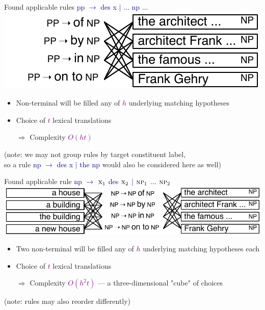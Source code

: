 \documentclass[landscape]{slides}
\newcommand{\example}[1]{\textcolor{darkblue}{\rm #1}}
\newcommand{\maths}[1]{\textcolor{purple}{#1}}
\begin{document}

\vspace{5mm}
\begin{center}
Found applicable rules \example{{\sc pp} $\rightarrow$ des {\sc x} $|$ ... {\sc np} ...}\\[5mm]
\includegraphics[scale=1.5]{cube-pruning-lexrule.pdf}
\end{center}
\begin{itemize} \itemsep -3mm
\item Non-terminal will be filled any of \maths{$h$} underlying matching hypotheses
\item Choice of \maths{$t$} lexical translations 
\item[$\Rightarrow$] Complexity \maths{$O(ht)$}
\end{itemize}
\begin{center}
{\small (note: we may not group rules by target constituent label,\\ so a rule \example{{\sc np} $\rightarrow$ des {\sc x} $|$ the {\sc np}} would also be considered here as well)}
\end{center}


\vspace{5mm}
\begin{center}
Found applicable rule \example{{\sc np} $\rightarrow$ $\text{\sc x}_1$ des $\text{\sc x}_2$ $|$ $\text{\sc np}_1$ ... $\text{\sc np}_2$}\\[5mm]
\includegraphics[scale=1.5]{cube-pruning-3.pdf}
\end{center}
\begin{itemize} \itemsep -3mm
\item Two non-terminal will be filled any of \maths{$h$} underlying matching hypotheses each
\item Choice of \maths{$t$} lexical translations 
\item[$\Rightarrow$] Complexity \maths{$O(h^2t)$} --- a three-dimensional "cube" of choices
\end{itemize}
\vspace{5mm}
\begin{center}
{\small (note: rules may also reorder differently)}
\end{center}
\end{document}
